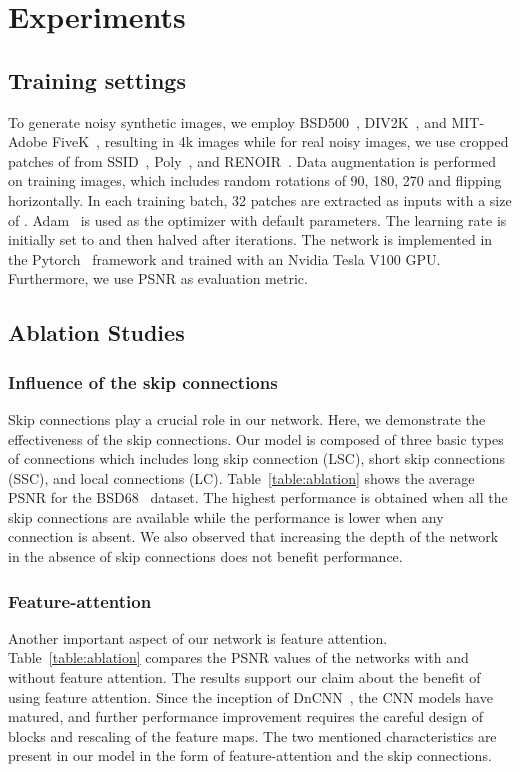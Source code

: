 \documentclass[10pt,twocolumn,letterpaper]{article}
\begin{document}
\section{Experiments}
 

\subsection{Training settings}
To generate noisy synthetic images, we employ BSD500~\cite{Martin2001BSD}, DIV2K~\cite{agustsson2017ntire}, and MIT-Adobe FiveK~\cite{bychkovsky2011learning}, resulting in 4k images while for real noisy images, we use cropped patches of  from SSID~\cite{abdelhamed2018high}, Poly~\cite{xu2018real}, and RENOIR~\cite{anaya2018renoir}. Data augmentation is performed on training images, which includes random rotations of 90, 180, 270 and flipping horizontally. In each training batch, 32 patches are extracted as inputs with a size of .  Adam~\cite{kingma2014adam} is used as the optimizer with default parameters. The learning rate is initially set to  and then halved after  iterations. The network is implemented in the Pytorch~\cite{paszke2017automatic} framework and trained with an Nvidia Tesla V100 GPU. Furthermore, we use PSNR as evaluation metric.

\subsection{Ablation Studies}


\subsubsection{Influence of the skip connections}
Skip connections play a crucial role in our network. Here, we demonstrate the effectiveness of the skip connections. Our model is composed of three basic types of connections which includes long skip connection (LSC),  short skip connections (SSC), and local connections (LC). Table~\ref{table:ablation} shows the average PSNR for the BSD68~\cite{roth2009fields} dataset. The highest performance is obtained when all the skip connections are available while the performance is lower when any connection is absent. We also observed that increasing the depth of the network in the absence of skip connections does not benefit performance.  



\subsubsection{Feature-attention}
Another important aspect of our network is feature attention. Table~\ref{table:ablation} compares the PSNR values of the networks with and without feature attention. The results support our claim about the benefit of using feature attention. Since the inception of DnCNN~\cite{zhang2017DnCNN}, the CNN models have matured, and further performance improvement requires the careful design of blocks and rescaling of the feature maps. The two mentioned characteristics are present in our model in the form of feature-attention and the skip connections.
\end{document}
